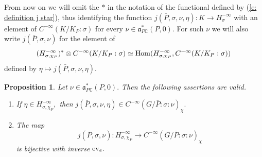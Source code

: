 \documentclass[12pt,a4paper]{article}
\newtheorem{Prop}[Thm]{Proposition}
\newenvironment{prop}[0]{\begin{Prop}\noindent}%
{\end{Prop}}
\def\itema{\vspace{-1mm}\item[{\rm (a)}]}
\def\itemb{\item[{\rm (b)}]}
\def\msy#1{{\mathbb #1}}
\def\C{{\msy C}}
\def\gs{\sigma}
\def\got#1{\mathfrak #1}
\def\fa{{\got a}}
\def\to{\rightarrow}
\def\Hom{{\rm Hom}}
\def\iC{{\scriptscriptstyle \C}}
\numberwithin{Thm}{section}
\numberwithin{equation}{section}
\def\ev{{\rm ev}}
\def\faPdc{{\fa_{P\iC}^*}}
\numberwithin{equation}{section}
\def\faPdc{\fa_{P\iC}^*}
\def\cchi{\chi}
\def\gsP{\gs}%
\begin{document}
From now on we will omit the $*$ in the notation of the functional defined by (\ref{e: definition j star}),
thus identifying the function $j(\bar P, \gs, \nu, \eta): K \to H_\gs^{-\infty}$ with an element 
of $C^{-\infty}(K/K_P: \gsP)$  for every $\nu \in \faPdc(P,0)$. 
For such $\nu$ we will also write
$j(\bar P, \gs, \nu)$ for the element of 
\begin{equation}
\label{e: image space j}
(H_{\gs,\cchi_P}^{-\infty})^*\otimes C^{-\infty}(K/K_P: \gsP)
\simeq \Hom( H_{\gs,\cchi_P}^{-\infty}, C^{-\infty}(K/K_P: \gsP))
\end{equation}
defined by $\eta \mapsto j(\bar P, \gs ,\nu, \eta).$ 

\begin{prop}
\label{p: bijectivity j in dominant region}
Let $\nu \in \faPdc(P,0).$ Then the following assertions are valid.
\begin{enumerate}
\itema
If $\eta \in H_{\gs,\cchi_P}^{-\infty},$ then $ 
j(\bar P,\gs,\nu,\eta) \in C^{-\infty}(G/\bar P : \gs :\nu)_\cchi.
$
\itemb
The map 
\begin{equation}
\label{e: the map j}
j(\bar P, \gs, \nu): H_{\gs,\cchi_P}^{-\infty} \to C^{-\infty}(G/\bar P:\gs:\nu)_\cchi
\end{equation}
is bijective with inverse $\ev_e.$ 
\end{enumerate} 
\end{prop}
\end{document}
